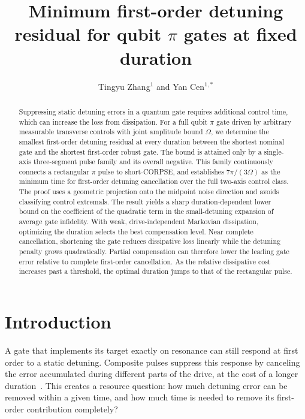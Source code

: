 \documentclass[12pt]{iopjournal}
\renewcommand{\articletype}[1]{\noindent{\small\sffamily\MakeUppercase{#1}}\par\vspace{1em}}
\begin{document}
\articletype{Paper}

\title{Minimum first-order detuning residual for qubit
\texorpdfstring{$\pi$}{pi} gates at fixed duration}
\author{Tingyu Zhang$^1$ and Yan Cen$^{1,*}$}





\begin{abstract}
Suppressing static detuning errors in a quantum gate requires additional
control time, which can increase the loss from dissipation. For a full
qubit $\pi$ gate driven by arbitrary measurable transverse controls
with joint amplitude bound $\Omega$, we determine the smallest
first-order detuning residual at every duration between the shortest
nominal gate and the shortest first-order robust gate. The bound is
attained only by a single-axis three-segment pulse family and its
overall negative. This family continuously connects a rectangular
$\pi$ pulse to short-CORPSE, and establishes $7\pi/(3\Omega)$ as the
minimum time for first-order detuning cancellation over the full
two-axis control class. The proof uses a geometric projection onto
the midpoint noise direction and avoids classifying control
extremals. The result yields a sharp duration-dependent lower bound
on the coefficient of the quadratic term in the small-detuning
expansion of average gate infidelity. With weak, drive-independent
Markovian dissipation, optimizing the duration selects the best
compensation level. Near complete cancellation, shortening the gate
reduces dissipative loss linearly while the detuning penalty grows
quadratically. Partial compensation can therefore lower the leading
gate error relative to complete first-order cancellation.
As the relative dissipative cost increases past a
threshold, the optimal duration jumps to that of the rectangular pulse.
\end{abstract}

\section{Introduction}

A gate that implements its target exactly on resonance can still
respond at first order to a static detuning. Composite pulses suppress
this response by canceling the error accumulated during different
parts of the drive, at the cost of a longer
duration~\cite{cummins2000,cummins2003}. This creates a resource
question: how much detuning error can be removed within a given time,
and how much time is needed to remove its first-order contribution
completely?
\end{document}
